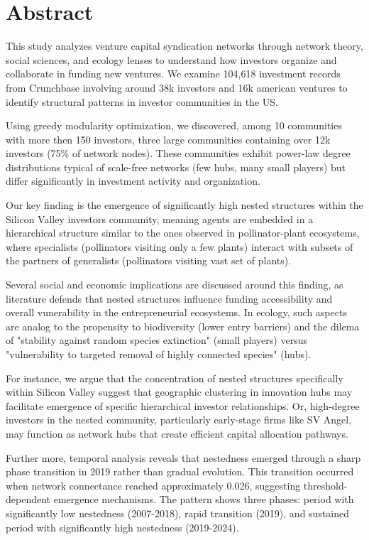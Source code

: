 \section*{Abstract}

This study analyzes venture capital syndication networks through network theory, social sciences, and ecology lenses to understand how investors organize and collaborate in funding new ventures. We examine 104,618 investment records from Crunchbase involving around 38k investors and 16k american ventures to identify structural patterns in investor communities in the US.

Using greedy modularity optimization, we discovered, among 10 communities with more then 150 investors, three large communities containing over 12k investors (75\% of network nodes). These communities exhibit power-law degree distributions typical of scale-free networks (few hubs, many small players) but differ significantly in investment activity and organization.

Our key finding is the emergence of significantly high nested structures within the Silicon Valley investors community, meaning agents are embedded in a hierarchical structure similar to the ones observed in pollinator-plant ecosystems, where specialists (pollinators visiting only a few plants) interact with subsets of the partners of generalists (pollinators visiting vast set of plants). 

Several social and economic implications are discussed around this finding, as literature defends that nested structures influence funding accessibility and overall vunerability in the entrepreneurial ecosystems. In ecology, such aspects are analog to the propensity to biodiversity (lower entry barriers) and the dilema of "stability against random species extinction" (small players) versus "vulnerability to targeted removal of highly connected species" (hubs).

For instance, we argue that the concentration of nested structures specifically within Silicon Valley suggest that geographic clustering in innovation hubs may facilitate emergence of specific hierarchical investor relationships. Or, high-degree investors in the nested community, particularly early-stage firms like SV Angel, may function as network hubs that create efficient capital allocation pathways. 

Further more, temporal analysis reveals that nestedness emerged through a sharp phase transition in 2019 rather than gradual evolution. This transition occurred when network connectance reached approximately 0.026, suggesting threshold-dependent emergence mechanisms. The pattern shows three phases: period with significantly low nestedness (2007-2018), rapid transition (2019), and sustained period with significantly high nestedness (2019-2024).

